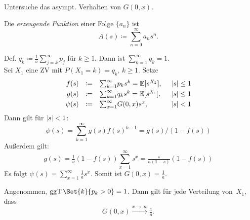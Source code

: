 \documentclass{cheat-sheet}
\newcommand{\E}{\mathbb{E}} %
\DeclareMathOperator{\ggT}{ggT} %
\begin{document}
\begin{ziel}
  Untersuche das asympt. Verhalten von $G(0, x)$.
\end{ziel}

\begin{defn}
  Die \emph{erzeugende Funktion} einer Folge $\{ a_n \}$ ist
  \[ A(s) \coloneqq {\sum}_{n=0}^\infty a_n s^n. \]
\end{defn}

\begin{rechnung}
  Def.
  $q_k \coloneqq \tfrac{1}{a} {\sum}_{j=k}^\infty p_j$
  für $k \geq 1$.
  Dann ist ${\sum}_{k=1}^\infty q_k = 1$. \\
  Sei $X_1$ eine ZV mit $P(X_1=k) = q_k$, $k \geq 1$.
  Setze
  \[
    \begin{array}{r c l l}
      f(s) &\coloneqq& {\sum}_{k=1}^\infty p_k s^k = \E[s^{X_2}], & \enspace \abs{s} \leq 1 \\[0.1cm]
      g(s) &\coloneqq& {\sum}_{k=1}^\infty q_k s^k = \E[s^{X_1}], & \enspace \abs{s} \leq 1 \\[0.1cm]
      \psi(s) &\coloneqq& {\sum}_{x=1}^\infty G(0, x) s^x, & \enspace \abs{s} < 1
    \end{array}
  \]
  Dann gilt für $\lvert s\rvert < 1$:
  \[ \psi(s) = {\sum}_{k=1}^\infty g(s) f(s)^{k-1} = g(s)/(1 - f(s)) \]
  Außerdem gilt:
  \[ g(s) = \tfrac{1}{a} (1 - f(s)) {\sum}_{x=1}^\infty s^x = \tfrac{s}{a (1-s)} (1 - f(s)) \]
  Es folgt $\psi(s) = {\sum}_{x=1}^\infty \tfrac{1}{a} s^x$.
  Somit ist $G(0, x) = \tfrac{1}{a}$.
\end{rechnung}

\begin{satz}
  Angenommen, $\ggT \Set{k}{p_k > 0} = 1$.
  Dann gilt für jede Verteilung von~$X_1$, dass
  \[ G(0, x) \xrightarrow{x \to \infty} \tfrac{1}{a}. \]
\end{satz}

%
\end{document}
